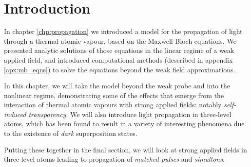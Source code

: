 \section{Introduction}
  \label{sec:nonlinear_intro}

  In chapter \ref{chp:propagation} we introduced a model for the propagation of
  light through a thermal atomic vapour, based on the Maxwell-Bloch equations.
  We presented analytic solutions of those equations in the linear regime of a
  weak applied field, and introduced computational methods (described in
  appendix \ref{apx:mb_eqns}) to solve the equations beyond the weak field
  approximations.

  In this chapter, we will take the model beyond the weak probe and into the
  nonlinear regime, demonstrating some of the effects that emerge from the
  interaction of thermal atomic vapours with strong applied fields: notably
  \textit{self-induced transparency}. We will also introduce light propagation
  in three-level atoms, which has been found to result in a variety of
  interesting phenomena due to the existence of \textit{dark} superposition
  states. 

  Putting these together in the final section, we will look at strong applied
  fields in three-level atoms leading to propagation of \textit{matched pulses}
  and \textit{simultons}.

  \newpage